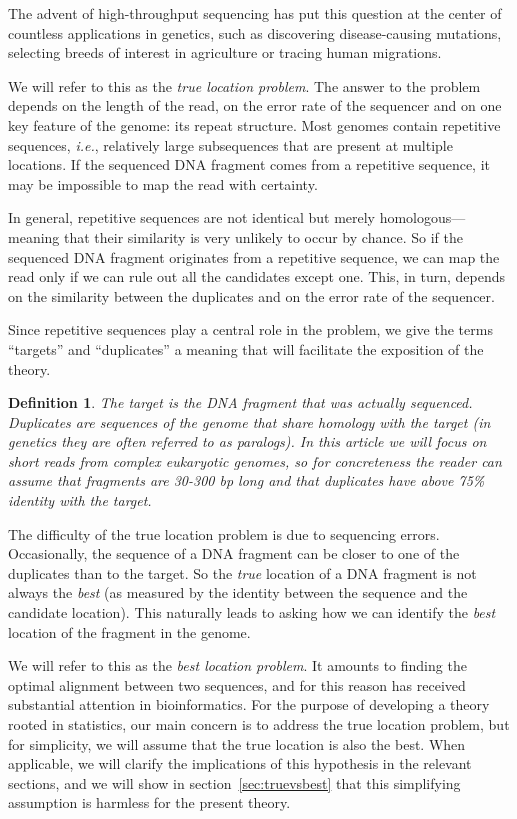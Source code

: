 \documentclass{article}
\newtheorem{definition}{Definition}
\begin{document}
The advent of high-throughput sequencing has put this question at the
center of countless applications in genetics, such as discovering
disease-causing mutations, selecting breeds of interest in agriculture or
tracing human migrations.

We will refer to this as the \emph{true location problem}. The answer to
the problem depends on the length of the read, on the error rate of the
sequencer and on one key feature of the genome: its repeat structure.
Most genomes contain repetitive sequences, \textit{i.e.}, relatively large
subsequences that are present at multiple locations. If the sequenced DNA
fragment comes from a repetitive sequence, it may be impossible to map the
read with certainty.

In general, repetitive sequences are not identical but merely
homologous---meaning that their similarity is very unlikely to occur by
chance. So if the sequenced DNA fragment originates from a repetitive
sequence, we can map the read only if we can rule out all the candidates
except one. This, in turn, depends on the similarity between the
duplicates and on the error rate of the sequencer.

Since repetitive sequences play a central role in the problem, we give the
terms ``targets'' and ``duplicates'' a meaning that will facilitate the
exposition of the theory.

\begin{definition}
\label{def_dup}
The target is the DNA fragment that was actually sequenced. Duplicates are
sequences of the genome that share homology with the target (in genetics
they are often referred to as paralogs). In this article we will focus on
short reads from complex eukaryotic genomes, so for concreteness the
reader can assume that fragments are 30-300 bp long and that duplicates
have above 75\% identity with the target.
\end{definition}

The difficulty of the true location problem is due to sequencing errors.
Occasionally, the sequence of a DNA fragment can be closer to one of the
duplicates than to the target. So the \emph{true} location of a DNA
fragment is not always the \emph{best} (as measured by the identity
between the sequence and the candidate location). This naturally leads to
asking how we can identify the \emph{best} location of the fragment in
the genome.

We will refer to this as the \emph{best location problem}. It amounts to
finding the optimal alignment between two sequences, and for this reason
has received substantial attention in bioinformatics. For the purpose of
developing a theory rooted in statistics, our main concern is to address
the true location problem, but for simplicity, we will assume that the
true location is also the best. When applicable, we will clarify the
implications of this hypothesis in the relevant sections, and we will show
in section~\ref{sec:truevsbest} that this simplifying assumption is harmless for
the present theory.
\end{document}
